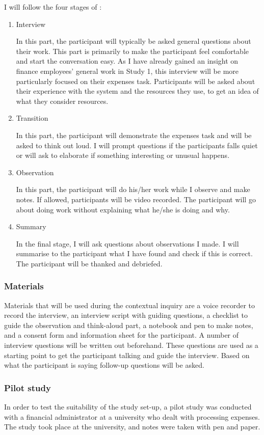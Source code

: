 \documentclass[11pt,oneside]{report}
\begin{document}
I will follow the four stages of \citet{Beyer1998}:
\begin{enumerate}
\item 
Interview

In this part, the participant will typically be asked general questions about their work. This part is primarily to make the participant feel comfortable and start the conversation easy. As I have already gained an insight on finance employees' general work in Study 1, this interview will be more particularly focused on their expenses task. Participants will be asked about their experience with the system  and the resources they use, to get an idea of what they consider resources.
\item 
Transition

In this part, the participant will demonstrate the expenses task and will be asked to think out loud. I will prompt questions if the participants falls quiet or will ask to elaborate if something interesting or unusual happens.
\item 
Observation

In this part, the participant will do his/her work while I observe and make notes. If allowed, participants will be video recorded. The participant will go about doing work without explaining what he/she is doing and why. 
\item 
Summary

In the final stage, I will ask questions about observations I made. I will summarise to the participant what I have found and check if this is correct. The participant will be thanked and debriefed.
\end{enumerate}

\subsubsection{Materials}
Materials that will be used during the contextual inquiry are a voice recorder to record the interview, an interview script with guiding questions, a checklist to guide the observation and think-aloud part, a notebook and pen to make notes, and a consent form and information sheet for the participant.
A number of interview questions will be written out beforehand. These questions are used as a starting point to get the participant talking and guide the interview. Based on what the participant is saying follow-up questions will be asked. 

\subsubsection{Pilot study}
In order to test the suitability of the study set-up, a pilot study was conducted with a financial administrator at a university who dealt with processing expenses. The study took place at the university, and notes were taken with pen and paper. 
\end{document}
